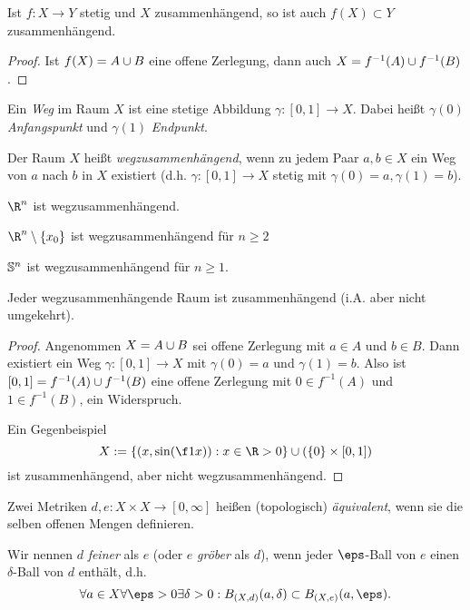 \begin{st}
	Ist $f: X \to Y$ stetig und $X$ zusammenhängend, so ist auch $f(X) \subset Y$ zusammenhängend.
	\begin{proof}
		Ist $f(X) = A \dunion B$ eine offene Zerlegung, dann auch $X = f^{-1}(A) \dunion f^{-1}(B)$.
	\end{proof}
\end{st}

\begin{df}
	Ein \emph{Weg} im Raum $X$ ist eine stetige Abbildung $\gamma: [0,1] \to X$.
	Dabei heißt $\gamma(0)$ \emph{Anfangspunkt} und $\gamma(1)$ \emph{Endpunkt}.

	Der Raum $X$ heißt \emph{wegzusammenhängend}, wenn zu jedem Paar $a,b \in X$ ein Weg von $a$ nach $b$ in $X$ existiert (d.h. $\gamma:[0,1] \to X$ stetig mit $\gamma(0) = a, \gamma(1) = b$).
\end{df}

\begin{ex}
	$\R^n$ ist wegzusammenhängend.

	$\R^n \setminus \{x_0\}$ ist wegzusammenhängend für $n \ge 2$

	$\S^n$ ist wegzusammenhängend für $n \ge 1$.
\end{ex}

\begin{st}
	Jeder wegzusammenhängende Raum ist zusammenhängend (i.A. aber nicht umgekehrt).
	\begin{proof}
		Angenommen $X = A \dunion B$ sei offene Zerlegung mit $a \in A$ und $b \in B$.
		Dann existiert ein Weg $\gamma: [0,1] \to X$ mit $\gamma(0) = a$ und $\gamma(1) = b$.
		Also ist $[0,1] = f^{-1}(A) \dunion f^{-1}(B)$ eine offene Zerlegung mit $0 \in f^{-1}(A)$ und $1 \in f^{-1}(B)$, ein Widerspruch.

		Ein Gegenbeispiel
		\[
			X := \{ (x,\sin(\f 1x)) : x \in \R>0 \} \cup ( \{0\} \times [0,1] )
		\]
		ist zusammenhängend, aber nicht wegzusammenhängend.
	\end{proof}
\end{st}

\begin{df}
	Zwei Metriken $d,e : X \times X \to [0, \infty]$ heißen (topologisch) \emph{äquivalent}, wenn sie die selben offenen Mengen definieren.

	Wir nennen $d$ \emph{feiner} als $e$ (oder $e$ \emph{gröber} als $d$), wenn jeder $\eps$-Ball von $e$ einen $\delta$-Ball von $d$ enthält, d.h.
	\[
		\forall a \in X \forall \eps > 0 \exists \delta > 0 : B_{(X,d)}(a, \delta) \subset B_{(X,e)}(a, \eps).
	\]
\end{df}

